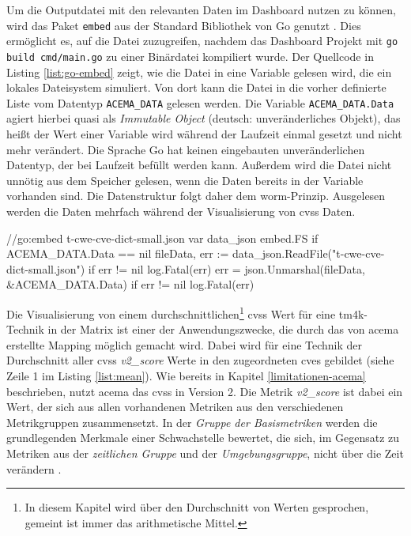 \par Um die Outputdatei mit den relevanten Daten im Dashboard nutzen zu können, wird das Paket \verb|embed| aus der Standard Bibliothek von Go genutzt \autocite{EmbedPackageEmbed}. Dies ermöglicht es, auf die Datei zuzugreifen, nachdem das Dashboard Projekt mit \verb|go build cmd/main.go| zu einer Binärdatei kompiliert wurde. Der Quellcode in Listing \ref{list:go-embed} zeigt, wie die Datei in eine Variable gelesen wird, die ein lokales Dateisystem simuliert. Von dort kann die Datei in die vorher definierte Liste vom Datentyp \verb|ACEMA_DATA| gelesen werden. Die Variable \verb|ACEMA_DATA.Data| agiert hierbei quasi als \textit{Immutable Object} (deutsch: unveränderliches Objekt), das heißt der Wert einer Variable wird während der Laufzeit einmal gesetzt und nicht mehr verändert. Die Sprache Go hat keinen eingebauten unveränderlichen Datentyp, der bei Laufzeit befüllt werden kann. Außerdem wird die Datei nicht unnötig aus dem Speicher gelesen, wenn die Daten bereits in der Variable vorhanden sind. Die Datenstruktur folgt daher dem \gls{worm}-Prinzip. Ausgelesen werden die Daten mehrfach während der Visualisierung von \gls{cvss} Daten.

\begin{code}[caption=Datei in Binardatei einbetten und in Struktur überführen, label={list:go-embed}]
    //go:embed t-cwe-cve-dict-small.json
    var data_json embed.FS
    if ACEMA_DATA.Data == nil {
        fileData, err := data_json.ReadFile("t-cwe-cve-dict-small.json")
        if err != nil {
            log.Fatal(err)
        }
        err = json.Unmarshal(fileData, &ACEMA_DATA.Data)
        if err != nil {
            log.Fatal(err)
        }
    }
\end{code}


Die Visualisierung von einem durchschnittlichen\footnote{In diesem Kapitel wird über den Durchschnitt von Werten gesprochen, gemeint ist immer das arithmetische Mittel.} \gls{cvss} Wert für eine \gls{tm4k}-Technik in der Matrix ist einer der Anwendungszwecke, die durch das von \gls{acema} erstellte Mapping möglich gemacht wird. Dabei wird für eine Technik der Durchschnitt aller \gls{cvss} \textit{v2\_score} Werte in den zugeordneten \glspl{cve} gebildet (siehe Zeile 1 im Listing \ref{list:mean}). Wie bereits in Kapitel \ref{limitationen-acema} beschrieben, nutzt \gls{acema} das \gls{cvss} in Version 2. Die Metrik \textit{v2\_score} ist dabei ein Wert, der sich aus allen vorhandenen Metriken aus den verschiedenen Metrikgruppen zusammensetzt. In der \textit{Gruppe der Basismetriken} werden die grundlegenden Merkmale einer Schwachstelle bewertet, die sich, im Gegensatz zu Metriken aus der \textit{zeitlichen Gruppe} und der \textit{Umgebungsgruppe}, nicht über die Zeit verändern \autocite{CVSSV2Complete}.

